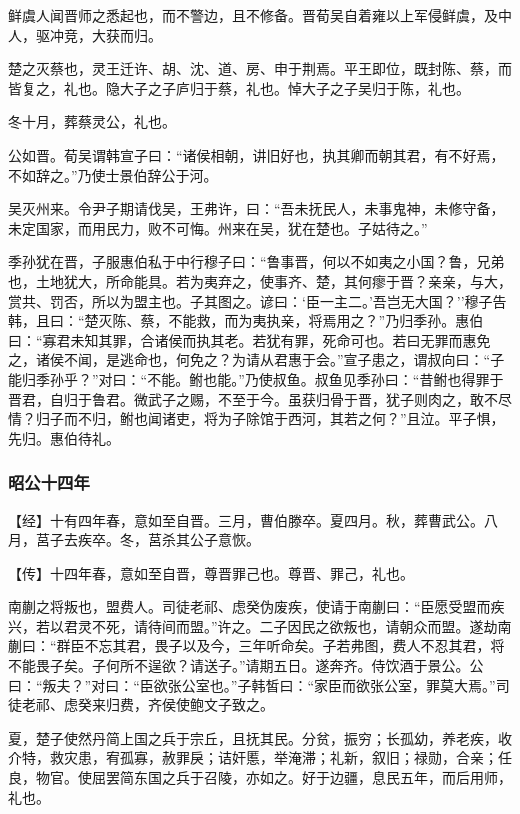 \documentclass[]{article}
\begin{document}
鲜虞人闻晋师之悉起也，而不警边，且不修备。晋荀吴自着雍以上军侵鲜虞，及中人，驱冲竞，大获而归。

楚之灭蔡也，灵王迁许、胡、沈、道、房、申于荆焉。平王即位，既封陈、蔡，而皆复之，礼也。隐大子之子庐归于蔡，礼也。悼大子之子吴归于陈，礼也。

冬十月，葬蔡灵公，礼也。

公如晋。荀吴谓韩宣子曰：``诸侯相朝，讲旧好也，执其卿而朝其君，有不好焉，不如辞之。''乃使士景伯辞公于河。

吴灭州来。令尹子期请伐吴，王弗许，曰：``吾未抚民人，未事鬼神，未修守备，未定国家，而用民力，败不可悔。州来在吴，犹在楚也。子姑待之。''

季孙犹在晋，子服惠伯私于中行穆子曰：``鲁事晋，何以不如夷之小国？鲁，兄弟也，土地犹大，所命能具。若为夷弃之，使事齐、楚，其何瘳于晋？亲亲，与大，赏共、罚否，所以为盟主也。子其图之。谚曰：`臣一主二。'吾岂无大国？''穆子告韩，且曰：``楚灭陈、蔡，不能救，而为夷执亲，将焉用之？''乃归季孙。惠伯曰：``寡君未知其罪，合诸侯而执其老。若犹有罪，死命可也。若曰无罪而惠免之，诸侯不闻，是逃命也，何免之？为请从君惠于会。''宣子患之，谓叔向曰：``子能归季孙乎？''对曰：``不能。鲋也能。''乃使叔鱼。叔鱼见季孙曰：``昔鲋也得罪于晋君，自归于鲁君。微武子之赐，不至于今。虽获归骨于晋，犹子则肉之，敢不尽情？归子而不归，鲋也闻诸吏，将为子除馆于西河，其若之何？''且泣。平子惧，先归。惠伯待礼。

\hypertarget{header-n2608}{%
\subsubsection{昭公十四年}\label{header-n2608}}

【经】十有四年春，意如至自晋。三月，曹伯滕卒。夏四月。秋，葬曹武公。八月，莒子去疾卒。冬，莒杀其公子意恢。

【传】十四年春，意如至自晋，尊晋罪己也。尊晋、罪己，礼也。

南蒯之将叛也，盟费人。司徒老祁、虑癸伪废疾，使请于南蒯曰：``臣愿受盟而疾兴，若以君灵不死，请待间而盟。''许之。二子因民之欲叛也，请朝众而盟。遂劫南蒯曰：``群臣不忘其君，畏子以及今，三年听命矣。子若弗图，费人不忍其君，将不能畏子矣。子何所不逞欲？请送子。''请期五日。遂奔齐。侍饮酒于景公。公曰：``叛夫？''对曰：``臣欲张公室也。''子韩皙曰：``家臣而欲张公室，罪莫大焉。''司徒老祁、虑癸来归费，齐侯使鲍文子致之。

夏，楚子使然丹简上国之兵于宗丘，且抚其民。分贫，振穷；长孤幼，养老疾，收介特，救灾患，宥孤寡，赦罪戾；诘奸慝，举淹滞；礼新，叙旧；禄勋，合亲；任良，物官。使屈罢简东国之兵于召陵，亦如之。好于边疆，息民五年，而后用师，礼也。
\end{document}
